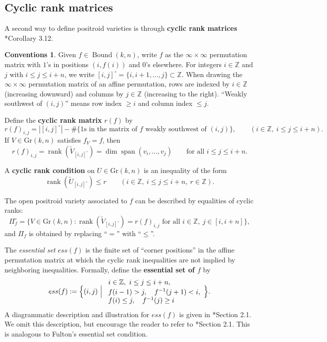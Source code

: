 \documentclass[12pt,reqno]{amsart}
\theoremstyle{definition}
\newtheorem*{conventions}{Conventions}
\newcommand{\Span}{\operatorname{span}}
\newcommand{\rank}{\operatorname{rank}}
\newcommand{\gr}{\mathrm{Gr}}
\newcommand{\bound}{\operatorname{Bound}}
\begin{document}
{\subsection{Cyclic rank matrices}
A second way to define positroid varieties is through \textbf{cyclic rank matrices} \cite{KLS13juggling}*{Corollary 3.12}.

\begin{conventions}
Given $f\in \bound(k,n)$, write $f$ as the $\infty\times\infty$ permutation matrix with $1$'s in positions $(i,f(i))$ and $0$'s elsewhere.
For integers \(i\in\mathbb Z\) and \(j\) with \(i\le j\le i+n\), we write
\([i,j]^\circ=\{i,i+1,\dots,j\}\subset\mathbb Z\).
When drawing the \(\infty\times\infty\) permutation matrix of an affine permutation,
rows are indexed by \(i\in\mathbb Z\) (increasing downward) and columns by \(j\in\mathbb Z\)
(increasing to the right). “Weakly southwest of \((i,j)\)” means row index \(\ge i\)
and column index \(\le j\).
\end{conventions}

Define the \textbf{cyclic rank matrix} $r(f)$ by
\[
r(f)_{i,j}
=
|[i,j]^\circ|
-
\#\{\text{1s in the matrix of }f\text{ weakly southwest of }(i,j)\},
\qquad (i\in \mathbb Z,\ i\le j\le i+n).
\]
If $V\in \gr(k,n)$ satisfies $f_V=f$, then
\[
r(f)_{i,j}=\rank(\widetilde V_{[i,j]^\circ})=\dim\Span(v_i,\dots,v_j)
\qquad \text{for all } i\le j\le i+n.
\]

A \textbf{cyclic rank condition} on $U\in \gr(k,n)$ is an inequality of the form
\[
\rank(\widetilde U_{[i,j]^\circ}) \le r
\qquad (i\in\mathbb Z,\ i\le j\le i+n,\ r\in \mathbb Z).
\]

\noindent
The open positroid variety associated to $f$ can be described by equalities of cyclic ranks:
\[
\Pi_f^\circ
=
\{V\in \gr(k,n): \rank(\widetilde V_{[i,j]^\circ})= r(f)_{i,j}
\text{ for all }i\in\mathbb Z,\ j\in[i,i+n]\},
\]
and $\Pi_f$ is obtained by replacing ``$=$'' with ``$\le$''.

\noindent
The \emph{essential set} \(ess(f)\) is the finite set of “corner positions” in the affine permutation matrix
at which the cyclic rank inequalities are not implied by neighboring inequalities. Formally,
define the \textbf{essential set of \(f\)} by
\[
ess(f):=\Bigl\{(i,j)\ \Big|\ 
\begin{array}{l}
i\in\mathbb Z,\ i\le j\le i+n,\\[2pt]
f(i-1)>j,\quad f^{-1}(j+1)<i,\\
f(i)\le j,\quad f^{-1}(j)\ge i
\end{array}
\Bigr\}.
\]
A diagrammatic description and illustration for $ess(f)$ is given in \cite{K14interval}*{Section 2.1}. We omit this description, but  encourage the reader to refer to \cite{K14interval}*{Section 2.1}. This is analogous to Fulton's essential set condition. 


}
\end{document}
